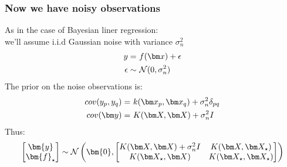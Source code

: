 
\begin{frame}
\frametitle{Now we have noisy observations}
As in the case of Bayesian liner regression:\\
we'll assume i.i.d Gaussian noise with variance $\sigma_n^2$
%
\begin{align*}
y =&~ f(\bx) + \epsilon \\
\epsilon \sim&~ \norm(0, \sigma_n^2)
\end{align*}
%
The prior on the noise observations is:
\renewcommand\theequation{2.\thedefcounter}
\setcounter{defcounter}{20}
\begin{align}
\nonumber{} cov(y_p, y_q) =&~ k(\bx_p, \bx_q) + \sigma_n^2 \delta_{pq} \\
cov(\by) =&~ K(\bX, \bX) + \sigma_n^2 I
\end{align}
%
Thus:
\renewcommand\theequation{2.\thedefcounter}
\setcounter{defcounter}{21}
\begin{equation}
\begin{bmatrix}
\bm{y}\\
\bm{f}_{\star}
\end{bmatrix}
\sim \norm\left(
\bm{0},
\begin{bmatrix}
K(\bX, \bX) + \sigma_n^2 I & K(\bX, \bX_{\star})\\
K(\bX_{\star}, \bX) & K(\bX_{\star}, \bX_{\star})
\end{bmatrix}
\right)
\end{equation}
\end{frame}


